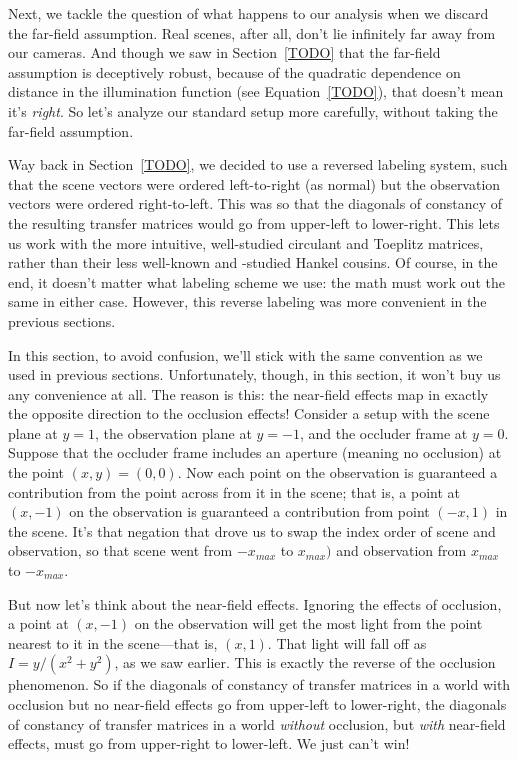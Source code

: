 Next, we tackle the question of what happens to our analysis when we discard the far-field assumption. Real scenes, after all, don't lie infinitely far away from our cameras. And though we saw in Section~\ref{TODO} that the far-field assumption is deceptively robust, because of the quadratic dependence on distance in the illumination function (see Equation~\ref{TODO}), that doesn't mean it's \emph{right}. So let's analyze our standard setup more carefully, without taking the far-field assumption.

Way back in Section~\ref{TODO}, we decided to use a reversed labeling system, such that the scene vectors were ordered left-to-right (as normal) but the observation vectors were ordered right-to-left. This was so that the diagonals of constancy of the resulting transfer matrices would go from upper-left to lower-right. This lets us work with the more intuitive, well-studied circulant and Toeplitz matrices, rather than their less well-known and -studied Hankel cousins. Of course, in the end, it doesn't matter what labeling scheme we use: the math must work out the same in either case. However, this reverse labeling was more convenient in the previous sections.

In this section, to avoid confusion, we'll stick with the same convention as we used in previous sections. Unfortunately, though, in this section, it won't buy us any convenience at all. The reason is this: the near-field effects map in exactly the opposite direction to the occlusion effects! Consider a setup with the scene plane at $y=1$, the observation plane at $y=-1$, and the occluder frame at $y=0$. Suppose that the occluder frame includes an aperture (meaning no occlusion) at the point $(x, y) = (0, 0)$. Now each point on the observation is guaranteed a contribution from the point across from it in the scene; that is, a point at $(x, -1)$ on the observation is guaranteed a contribution from point $(-x, 1)$ in the scene. It's that negation that drove us to swap the index order of scene and observation, so that scene went from $-x_{max}$ to $x_{max})$ and observation from $x_{max}$ to $-x_{max}$.

But now let's think about the near-field effects. Ignoring the effects of occlusion, a point at $(x, -1)$ on the observation will get the most light from the point nearest to it in the scene---that is, $(x, 1)$. That light will fall off as $I = y/(x^2 + y^2)$, as we saw earlier. This is exactly the reverse of the occlusion phenomenon. So if the diagonals of constancy of transfer matrices in a world with occlusion but no near-field effects go from upper-left to lower-right, the diagonals of constancy of transfer matrices in a world \emph{without} occlusion, but \emph{with} near-field effects, must go from upper-right to lower-left. We just can't win!

